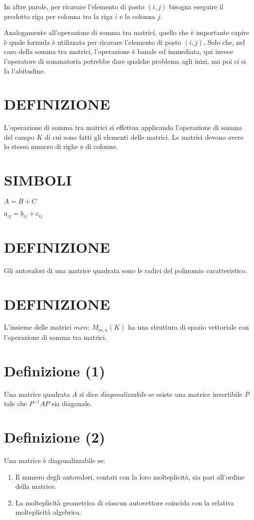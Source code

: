 In altre parole, per ricavare l'elemento di posto $(i,j)$ bisogna eseguire il prodotto riga per colonna tra la riga $i$ e la colonna $j$.

Analogamente all'operazione di somma tra matrici, quello che \`{e} importante capire \`{e} quale formula \`{e} utilizzata per ricavare l'elemento di posto $(i,j)$. Solo che,
nel caso della somma tra matrici, l'operazione \`{e} banale ed immediata, qui invece l'operatore di sommatoria potrebbe dare qualche problema agli inizi, ma poi ci si fa l'abitudine.



\section{DEFINIZIONE}
L'operazione di somma tra matrici si effettua applicando l'operazione di somma del campo $K$ di cui sono fatti gli elementi delle matrici.
Le matrici devono avere lo stesso numero di righe e di colonne.

\section{SIMBOLI}
$A = B + C$

$a_{ij} = b_{ij} + c_{ij}$





\section{DEFINIZIONE}
Gli autovalori di una matrice quadrata sono le radici del polinomio caratteristico.




\section{DEFINIZIONE}
L'insieme delle matrici $mxn$: $M_{m,n}(K)$ ha una struttura di spazio vettoriale con l'operazione di somma tra matrici.


\section{Definizione (1)}
Una matrice quadrata $A$ si dice \textit{diagonalizzabile} se esiste una matrice invertibile $P$ tale che $P^{-1}AP$ sia diagonale.

\section{Definizione (2)}
Una matrice è diagonalizzabile se:
\begin{enumerate}
 \item Il numero degli autovalori, contati con la loro molteplicità, sia pari all'ordine della matrice.
 \item La molteplicità geometrica di ciascun autovettore coincida con la relativa molteplicità algebrica.
\end{enumerate}

